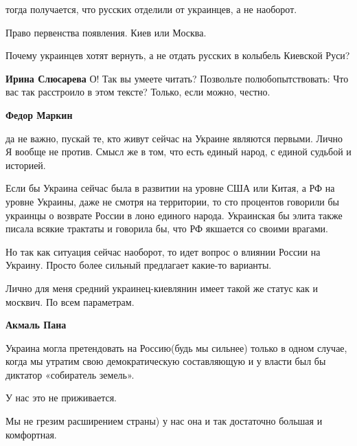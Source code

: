 \begin{itemize}
\begin{itemize}
тогда получается, что русских отделили от украинцев, а не наоборот.

Право первенства появления. Киев или Москва.

Почему украинцев хотят вернуть, а не отдать русских в колыбель Киевской Руси?


 
\textbf{Ирина Слюсарева} О! Так вы умеете читать? Позвольте полюбопытствовать: Что вас так расстроило в этом тексте? Только, если можно, честно.

 
\textbf{Федор Маркин} 

да не важно, пускай те, кто живут сейчас на Украине являются первыми. Лично Я
вообще не против. Смысл же в том, что есть единый народ, с единой судьбой и
историей.

Если бы Украина сейчас была в развитии на уровне США или Китая, а РФ на уровне
Украины, даже не смотря на территории, то сто процентов говорили бы украинцы о
возврате России в лоно единого народа. Украинская бы элита также писала всякие
трактаты и говорила бы, что РФ якшается со своими врагами.

Но так как ситуация сейчас наоборот, то идет вопрос о влиянии России на
Украину. Просто более сильный предлагает какие-то варианты.

Лично для меня средний украинец-киевлянин имеет такой же статус как и москвич.
По всем параметрам.

 
\textbf{Акмаль Пана} 

Украина могла претендовать на Россию(будь мы сильнее) только в одном случае,
когда мы утратим свою демократическую составляющую и у власти был бы диктатор
«собиратель земель».

У нас это не приживается.

Мы не грезим расширением страны) у нас она и так достаточно большая и
комфортная.


\end{itemize}
\end{itemize}
